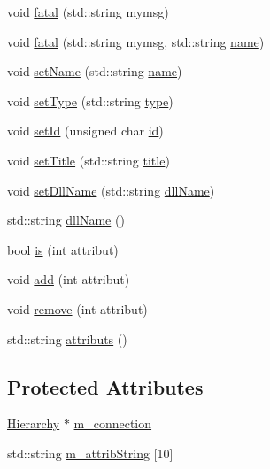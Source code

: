 \begin{DoxyCompactItemize}
\item 
void \hyperlink{classObject_aad5a16aac7516ce65bd5ec02ab07fc80}{fatal} (std\+::string mymsg)
\item 
void \hyperlink{classObject_ae62acd3d09f716220f75f252dc38bc9a}{fatal} (std\+::string mymsg, std\+::string \hyperlink{classObject_a300f4c05dd468c7bb8b3c968868443c1}{name})
\item 
void \hyperlink{classObject_ae30fea75683c2d149b6b6d17c09ecd0c}{set\+Name} (std\+::string \hyperlink{classObject_a300f4c05dd468c7bb8b3c968868443c1}{name})
\item 
void \hyperlink{classObject_aae534cc9d982bcb9b99fd505f2e103a5}{set\+Type} (std\+::string \hyperlink{classObject_a84f99f70f144a83e1582d1d0f84e4e62}{type})
\item 
void \hyperlink{classObject_a398fe08cba594a0ce6891d59fe4f159f}{set\+Id} (unsigned char \hyperlink{classObject_af99145335cc61ff6e2798ea17db009d2}{id})
\item 
void \hyperlink{classObject_a89557dbbad5bcaa02652f5d7fa35d20f}{set\+Title} (std\+::string \hyperlink{classObject_a73a0f1a41828fdd8303dd662446fb6c3}{title})
\item 
void \hyperlink{classObject_a870c5af919958c2136623b2d7816d123}{set\+Dll\+Name} (std\+::string \hyperlink{classObject_a2e3947f2870094c332d7454117f3ec63}{dll\+Name})
\item 
std\+::string \hyperlink{classObject_a2e3947f2870094c332d7454117f3ec63}{dll\+Name} ()
\item 
bool \hyperlink{classAttrib_a704f26af560909ad22065083bb7d4c34}{is} (int attribut)
\item 
void \hyperlink{classAttrib_a235f773af19c900264a190b00a3b4ad7}{add} (int attribut)
\item 
void \hyperlink{classAttrib_a7d4ef7e32d93cb287792b87b857e79f3}{remove} (int attribut)
\item 
std\+::string \hyperlink{classAttrib_aee7bbf16b144887f196e1341b24f8a26}{attributs} ()
\end{DoxyCompactItemize}
\subsection*{Protected Attributes}
\begin{DoxyCompactItemize}
\item 
\hyperlink{classHierarchy}{Hierarchy} $\ast$ \hyperlink{classElement_abe3de7a5dbbc9a6dd2d7e012e5fdb266}{m\+\_\+connection}
\item 
std\+::string \hyperlink{classAttrib_a3414521d7a82476e874b25a5407b5e63}{m\+\_\+attrib\+String} \mbox{[}10\mbox{]}
\end{DoxyCompactItemize}

